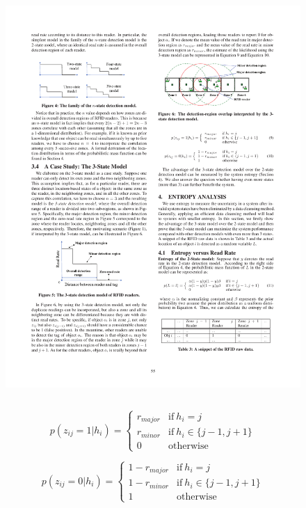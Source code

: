 \begin{frame}
\begin{columns}[c]
  \begin{figure}[tb]
    \includegraphics[width=\columnwidth]{figures/3-1/3-1-7.pdf}
  \end{figure}

\end{columns}

\vspace{10pt}
\begin{equation}
  p(z_{ij} = 1 | h_i) = \left\{\begin{matrix}
 r_{major} & \text{if}~h_i = j\\
 r_{minor} & \text{if}~h_i \in \{j-1, j+1\}\\
 0 & \text{otherwise}
\end{matrix}\right.
\end{equation}

\begin{equation}
  p(z_{ij} = 0 | h_i) = \left\{\begin{matrix}
  1- r_{major} & \text{if}~h_i = j\\
  1- r_{minor} & \text{if}~h_i \in \{j-1, j+1\}\\
 1 & \text{otherwise}
\end{matrix}\right.
\end{equation}

\end{frame}

